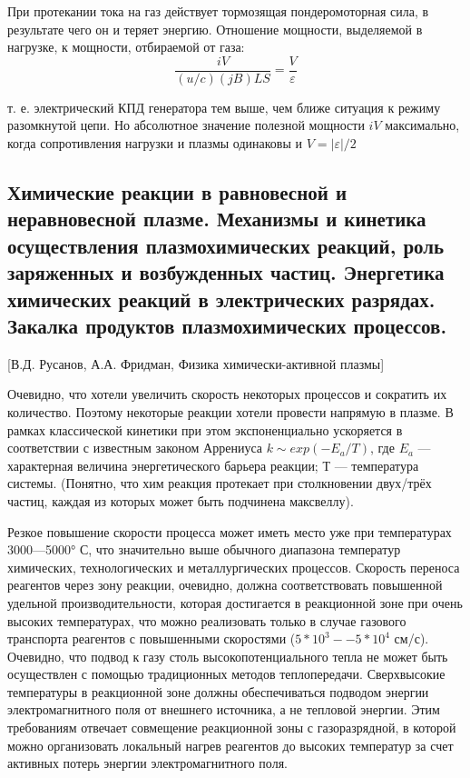 \documentclass[10pt, a4paper]{article}
\begin{document}
При протекании тока на газ действует тормозящая пондеромоторная сила, в результате чего он и теряет энергию. Отношение мощности, выделяемой в нагрузке, к мощности, отбираемой от газа: 
\begin{equation}
	\frac{iV}{(u/c)(jB)LS}=\frac{V}{\varepsilon}
\end{equation}

т. е. электрический КПД генератора тем выше, чем ближе ситуация к режиму разомкнутой цепи. Но абсолютное значение полезной мощности $iV$ максимально, когда сопротивления нагрузки и плазмы одинаковы и $V=|\varepsilon|/2$


\subsection{Химические реакции в равновесной и неравновесной плазме. \textcolor[rgb]{1,0,0}{Механизмы и кинетика осуществления плазмохимических реакций, роль заряженных и возбужденных частиц. Энергетика химических реакций в электрических разрядах}. Закалка продуктов плазмохимических процессов.}
 
[В.Д. Русанов, А.А. Фридман, Физика химически-активной плазмы]

Очевидно, что хотели увеличить скорость некоторых процессов и сократить их количество. Поэтому некоторые реакции хотели провести напрямую в плазме. В рамках классической кинетики при этом экспоненциально ускоряется в соответствии с известным законом Аррениуса $ k \sim exp(-E_{a}/T)$, где $E_a$ — характерная величина энергетического барьера реакции; Т — температура системы. (Понятно, что хим реакция протекает при столкновении двух/трёх частиц, каждая из которых может быть подчинена максвеллу).
 
Резкое повышение скорости процесса может иметь место уже при температурах 3000—5000° С, что значительно выше обычного диапазона температур химических, технологических и  металлургических процессов. Скорость переноса реагентов через зону реакции, очевидно, должна соответствовать повышенной удельной производительности, которая достигается в реакционной зоне при очень высоких температурах, что можно реализовать только в случае газового транспорта реагентов с повышенными скоростями ($5*10^{3}--5*10^{4}$ см/с). 
Очевидно, что подвод к газу столь высокопотенциального тепла не может быть осуществлен с помощью традиционных методов теплопередачи. Сверхвысокие температуры в реакционной зоне должны обеспечиваться подводом энергии электромагнитного поля от внешнего источника, а не тепловой энергии. Этим требованиям отвечает совмещение реакционной зоны с газоразрядной, в которой можно организовать локальный нагрев реагентов до высоких температур за счет активных потерь энергии электромагнитного поля.
\end{document}

